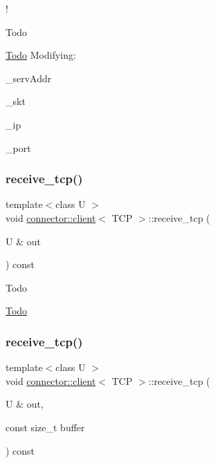 !\begin{DoxyRefDesc}{Todo}
\item[\hyperlink{todo__todo000001}{Todo}]Modifying\+:
\begin{DoxyItemize}
\item {\ttfamily \+\_\+serv\+Addr}
\item {\ttfamily \+\_\+skt}
\item {\ttfamily \+\_\+ip}
\item {\ttfamily \+\_\+port} 
\end{DoxyItemize}\end{DoxyRefDesc}
\mbox{\label{classconnector_1_1client_3_01TCP_01_4_aede666f3c255ad8821cb1c844702f046}} 
\subsubsection{\texorpdfstring{receive\+\_\+tcp()}{receive\_tcp()}\hspace{0.1cm}{\footnotesize\ttfamily [1/2]}}
{\footnotesize\ttfamily template$<$class U $>$ \\
void \hyperlink{classconnector_1_1client}{connector\+::client}$<$ T\+CP $>$\+::receive\+\_\+tcp (\begin{DoxyParamCaption}\item[{U \&}]{out }\end{DoxyParamCaption}) const\hspace{0.3cm}{\ttfamily [inline]}}

\begin{DoxyRefDesc}{Todo}
\item[\hyperlink{todo__todo000002}{Todo}]\end{DoxyRefDesc}
\mbox{\label{classconnector_1_1client_3_01TCP_01_4_a1b2a674bf93a7e1533016c2f8393d64c}} 
\subsubsection{\texorpdfstring{receive\+\_\+tcp()}{receive\_tcp()}\hspace{0.1cm}{\footnotesize\ttfamily [2/2]}}
{\footnotesize\ttfamily template$<$class U $>$ \\
void \hyperlink{classconnector_1_1client}{connector\+::client}$<$ T\+CP $>$\+::receive\+\_\+tcp (\begin{DoxyParamCaption}\item[{U \&}]{out,  }\item[{const size\+\_\+t}]{buffer }\end{DoxyParamCaption}) const\hspace{0.3cm}{\ttfamily [inline]}}

